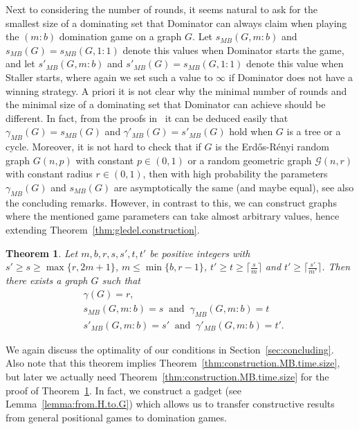 \documentclass[reqno, 12pt]{amsart}
\numberwithin{equation}{section}
\numberwithin{figure}{section}
\newtheorem{theorem}{Theorem}
\begin{document}
Next to considering the number of rounds, it seems natural to ask for the smallest size of a dominating set that Dominator can
always claim when playing the $(m:b)$ domination game on a graph $G$. Let $s_{MB}(G,m:b)$ and $s_{MB}(G)=s_{MB}(G,1:1)$ denote this values when Dominator starts the game, and let $s'_{MB}(G,m:b)$ and $s'_{MB}(G)=s_{MB}(G,1:1)$ denote this value when Staller starts, where again we set such a value to $\infty$ if Dominator does not have a winning strategy.
A priori it is not clear why 
the minimal number of rounds and the minimal size 
of a dominating set that Dominator can achieve
should be different. 
In fact, from the proofs in~\cite{gledel2019maker} 
it can be deduced easily that
$\gamma_{MB}(G)=s_{MB}(G)$ and
$\gamma'_{MB}(G)=s'_{MB}(G)$ hold when 
$G$ is a tree or a cycle.
Moreover, it is not hard to check that
if $G$ is the Erd\H{o}s-R\'enyi random graph $G(n,p)$ with constant $p\in (0,1)$ or a random geometric graph $\mathcal{G}(n,r)$ with constant radius $r\in (0,1)$, then with high probability the parameters
$\gamma_{MB}(G)$ and $s_{MB}(G)$ are asymptotically the same (and maybe equal), see also the concluding remarks.
However, in contrast to this, we can construct graphs where the mentioned game parameters can take almost arbitrary values, hence extending Theorem~\ref{thm:gledel.construction}.


\begin{theorem}
\label{thm:construction.Gledel.improved}
Let $m,b,r,s,s',t,t'$ be positive integers
with $s'\geq s\geq \max\{r,2m+1\}$, $m\leq \min\{b,r-1\}$, $t' \geq t\geq \lceil \frac{s}{m} \rceil$ and $t'\geq \lceil \frac{s'}{m'} \rceil$. Then
there exists a graph $G$ such that 
\begin{align*}
& \gamma(G)=r, \\
& s_{MB}(G,m:b)=s ~ \text{ and } ~ \gamma_{MB}(G,m:b)=t\\
& s'_{MB}(G,m:b)=s' ~ \text{ and } ~ \gamma'_{MB}(G,m:b)=t' .
\end{align*}
\end{theorem}

We again discuss the optimality of our conditions in Section~\ref{sec:concluding}. 
Also note that this theorem implies Theorem~\ref{thm:construction.MB.time.size}, but later we actually need Theorem~\ref{thm:construction.MB.time.size}
for the proof of Theorem~\ref{thm:construction.Gledel.improved}.
In fact, we construct a gadget (see Lemma~\ref{lemma:from.H.to.G}) which allows us to transfer 
constructive results from general positional games
to domination games. 
\end{document}
